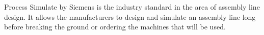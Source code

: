 Process Simulate by Siemens is the industry standard in the area of assembly line design. It allows the manufacturers to design and simulate an assembly line long before breaking the ground or ordering the machines that will be used.
